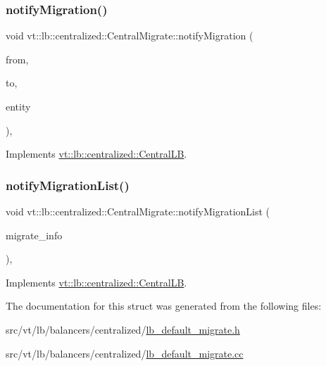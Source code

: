 \subsubsection{\texorpdfstring{notify\+Migration()}{notifyMigration()}}
{\footnotesize\ttfamily void vt\+::lb\+::centralized\+::\+Central\+Migrate\+::notify\+Migration (\begin{DoxyParamCaption}\item[{\hyperlink{namespacevt_a866da9d0efc19c0a1ce79e9e492f47e2}{Node\+Type} const \&}]{from,  }\item[{\hyperlink{namespacevt_a866da9d0efc19c0a1ce79e9e492f47e2}{Node\+Type} const \&}]{to,  }\item[{\hyperlink{namespacevt_a92ec26fb6644cd0ba7eb0ee70c96bee5}{L\+B\+Entity\+Type} const \&}]{entity }\end{DoxyParamCaption})\hspace{0.3cm}{\ttfamily [override]}, {\ttfamily [virtual]}}



Implements \hyperlink{structvt_1_1lb_1_1centralized_1_1_central_l_b_af7a0204c9839ccf77a2fd724a2c9841c}{vt\+::lb\+::centralized\+::\+Central\+LB}.

\mbox{\label{structvt_1_1lb_1_1centralized_1_1_central_migrate_a53c5eb03e2f6af93f207093683bbbd17}} 
\subsubsection{\texorpdfstring{notify\+Migration\+List()}{notifyMigrationList()}}
{\footnotesize\ttfamily void vt\+::lb\+::centralized\+::\+Central\+Migrate\+::notify\+Migration\+List (\begin{DoxyParamCaption}\item[{\hyperlink{structvt_1_1lb_1_1centralized_1_1_central_l_b_a8d393c0126180fb8cce2b881c23df44f}{Migrate\+Info\+Type} const \&}]{migrate\+\_\+info }\end{DoxyParamCaption})\hspace{0.3cm}{\ttfamily [override]}, {\ttfamily [virtual]}}



Implements \hyperlink{structvt_1_1lb_1_1centralized_1_1_central_l_b_a478778a92cd3a05b9aa4b2b417cb4a4b}{vt\+::lb\+::centralized\+::\+Central\+LB}.



The documentation for this struct was generated from the following files\+:\begin{DoxyCompactItemize}
\item 
src/vt/lb/balancers/centralized/\hyperlink{lb__default__migrate_8h}{lb\+\_\+default\+\_\+migrate.\+h}\item 
src/vt/lb/balancers/centralized/\hyperlink{lb__default__migrate_8cc}{lb\+\_\+default\+\_\+migrate.\+cc}\end{DoxyCompactItemize}
